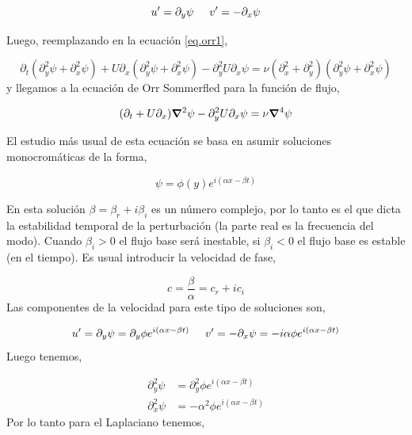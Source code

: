 \documentclass[executivepaper,12pt]{article}
\numberwithin{equation}{section}
\begin{document}
\begin{equation*}
	u'=\partial_y\psi \hspace{0.5cm} v'=-\partial_x\psi
\end{equation*} 

Luego, reemplazando en la ecuación \ref{eq.orr1}, 

\begin{equation*}
	\partial_t(\partial_y^2\psi +\partial_x^2 \psi) +U\partial_x(\partial_y^2\psi +\partial_x^2 \psi)-\partial_y^2 U \partial_x\psi=\nu(\partial_x^2 +\partial_y^2)(\partial_y^2 \psi+\partial_x^2\psi)
\end{equation*}
y llegamos a la ecuación de Orr Sommerfled para la función de flujo, 

\begin{equation}
	(\partial_t  +U\partial_x)\gradient^2 \psi-\partial_y^2 U \partial_x\psi=\nu\gradient^4\psi
	\label{eq.orr3}
\end{equation}

El estudio más usual de esta ecuación se basa en asumir soluciones monocromáticas de la forma,

\begin{equation*}
	\psi=\phi(y)e^{i(\alpha x -\beta t)}
\end{equation*}

En esta solución $\beta=\beta_r+i\beta_i$ es un número complejo, por lo tanto es el que dicta la estabilidad temporal de la perturbación (la parte real es la frecuencia del modo). Cuando $\beta_i>0$ el flujo base será inestable, si $\beta_i<0$ el flujo base es estable (en el tiempo). Es usual introducir la velocidad de fase,

\begin{equation*}
	c=\frac{\beta}{\alpha}=c_r+ic_i
\end{equation*}
Las componentes de la velocidad para este tipo de soluciones son,

\begin{equation*}
	u'=\partial_y \psi=\partial_y \phi e^{i(\alpha x -\beta t)} \hspace{0.5cm} v'=-\partial_x\psi=-i\alpha\phi e^{i(\alpha x -\beta t)}
\end{equation*}
Luego tenemos, 

\begin{align*}
	\partial^2_y\psi &=\partial_y^2 \phi e^{i(\alpha x -\beta t)}\\
	\partial_x^2\psi &=-\alpha ^2 \phi e^{i(\alpha x -\beta t)}
\end{align*}
Por lo tanto para el Laplaciano tenemos,
\end{document}
